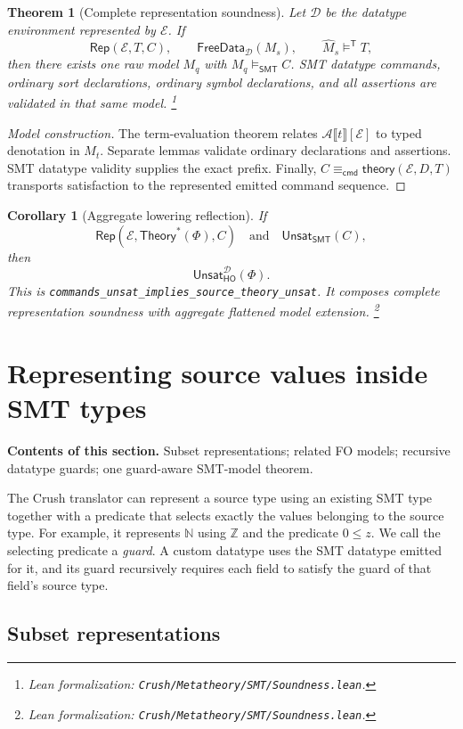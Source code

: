 \documentclass[11pt]{article}
\newtheorem{theorem}[definition]{Theorem}
\newtheorem{corollary}[definition]{Corollary}
\theoremstyle{remark}
\newcommand{\leanfile}[1]{\footnote{Lean formalization: \texttt{Crush/Metatheory/#1}.}}
\newcommand{\sectioncontents}[1]{%
  \smallskip\noindent\textbf{Contents of this section.} #1\par\medskip}
\newcommand{\smtenc}[2]{\mathcal A\llbracket #2\rrbracket[#1]}
\newcommand{\satt}{\models^{\mathsf T}}
\newcommand{\smtsat}{\models_{\mathsf{SMT}}}
\newcommand{\unsat}{\mathsf{Unsat}}
\newcommand{\Theorys}[1]{\mathsf{Theory}^{\!*}(#1)}
\newcommand{\Rep}{\mathsf{Rep}}
\newcommand{\SameCmd}{\mathrel{\equiv_{\mathsf{cmd}}}}
\newcommand{\FreeDataModel}{\mathsf{FreeData}}
\begin{document}
\begin{theorem}[Complete representation soundness]
Let $\mathcal D$ be the datatype environment represented by $\mathcal E$. If
\[
 \Rep(\mathcal E,T,C),\qquad
 \FreeDataModel_{\mathcal D}(M_s),\qquad
 \widehat M_s\satt T,
\]
then there exists one raw model $M_q$ with $M_q\smtsat C$. SMT datatype
commands, ordinary sort declarations, ordinary symbol declarations, and all
assertions are validated in that same model.
\leanfile{SMT/Soundness.lean}
\end{theorem}
\begin{proof}[Model construction]
The term-evaluation theorem relates $\smtenc{\mathcal E}{t}$ to typed
denotation in $M_t$. Separate lemmas validate ordinary declarations and
assertions. SMT datatype validity supplies the exact prefix. Finally,
$C\SameCmd\mathsf{theory}(\mathcal E,D,T)$ transports satisfaction to the
represented emitted command sequence.
\end{proof}

\begin{corollary}[Aggregate lowering reflection]
If
\[
 \Rep(\mathcal E,\Theorys{\Phi},C)
 \quad\text{and}\quad
 \unsat_{\mathsf{SMT}}(C),
\]
then
\[
 \unsat_{\mathsf{HO}}^{\mathcal D}(\Phi).
\]
This is \texttt{commands\_unsat\_implies\_source\_theory\_unsat}. It composes
complete representation soundness with aggregate flattened model extension.
\leanfile{SMT/Soundness.lean}
\end{corollary}

\section{Representing source values inside SMT types}
\label{sec:guarded-representations}
\sectioncontents{Subset representations; related FO models; recursive datatype guards; one guard-aware SMT-model theorem.}

The Crush translator can represent a source type using an existing SMT type together
with a predicate that selects exactly the values belonging to the source type.
For example, it represents $\mathbb N$ using $\mathbb Z$ and the predicate
$0\le z$. We call the selecting predicate a \emph{guard}. A custom datatype
uses the SMT datatype emitted for it, and its guard recursively requires each
field to satisfy the guard of that field's source type.

\subsection{Subset representations}
\end{document}
